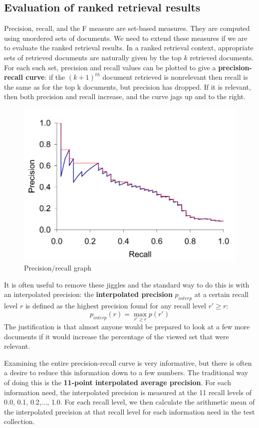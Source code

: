 \documentclass[letterpaper,11pt]{article}
\begin{document}
\subsection{Evaluation of ranked retrieval results}
Precision, recall, and the F measure are set-based measures. They are computed using unordered sets of documents. We need to extend these measures if we are to evaluate the ranked retrieval results. In a ranked retrieval context, appropriate sets of retrieved documents are naturally given by the top $k$ retrieved documents. For each such set, precision and recall values can be plotted to give a \textbf{precision-recall curve}:
if the $(k + 1)^{th}$ document retrieved is nonrelevant then recall is the same as for the top k documents, but precision has dropped. If it is relevant, then both precision and recall increase, and the curve jags up and to the right.
\begin{figure}[H]
    \centering
    \includegraphics[scale=0.55]{sect8/figure_8_2.png}
    \caption{Precision/recall graph}
\end{figure}
It is often useful to remove these jiggles and the standard way to do this is with an interpolated precision: the \textbf{interpolated precision} $p_{interp}$ at a certain recall level $r$ is defined as the highest precision found for any recall level $r' \geq r$:
\[
p_{interp}(r) = \max_{r' \geq r}p(r') 
\]
The justification is that almost anyone would be prepared to look at a few more documents if it would increase the percentage of the viewed set that were relevant.

Examining the entire precision-recall curve is very informative, but there is often a desire to reduce this information down to a few numbers. The traditional way of doing this is the \textbf{11-point interpolated average precision}. For each information need, the interpolated precision is measured at the 11 recall levels of 0.0, 0.1, 0.2,..., 1.0. For each recall level, we then calculate the arithmetic mean of the interpolated precision at that recall level for each information need in the test collection.
\end{document}
